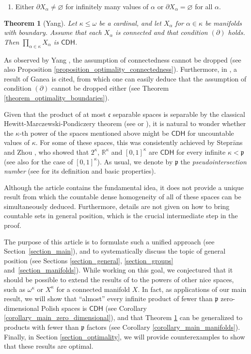 \documentclass{amsart}
\theoremstyle{plain}
\newtheorem{theorem}{Theorem}[section]
\theoremstyle{definition}
\newcommand{\CDH}{\mathsf{CDH}}
\newcommand{\RRR}{\mathbb{R}}
\newcommand{\cccc}{\mathfrak{c}}
\newcommand{\pppp}{\mathfrak{p}}
\begin{document}
\begin{enumerate}
\item[$(\partial)$]	Either $\partial X_\alpha\neq\varnothing$ for infinitely many values of $\alpha$ or $\partial X_\alpha=\varnothing$ for all $\alpha$.
\end{enumerate}

\begin{theorem}[Yang]\label{theorem_yang}
Let $\kappa\leq\omega$ be a cardinal, and let $X_\alpha$ for $\alpha\in\kappa$ be manifolds with boundary. Assume that each $X_\alpha$ is connected and that condition $(\partial)$ holds. Then $\prod_{\alpha\in\kappa}X_\alpha$ is $\CDH$.
\end{theorem}

As observed by Yang \cite[Example 1]{yang}, the assumption of connectedness cannot be dropped (see also Proposition \ref{proposition_optimality_connectedness}). Furthermore, in \cite[Remark 2]{yang}, a result of Ganea \cite{ganea} is cited, from which one can easily deduce that the assumption of condition $(\partial)$ cannot be dropped either (see Theorem \ref{theorem_optimality_boundaries}).

Given that the product of at most $\cccc$ separable spaces is separable by the classical Hewitt-Marczewski-Pondiczery theorem (see \cite[Corollary 2.3.16]{engelking} or \cite[Exercise III.2.13]{kunen}), it is natural to wonder whether the $\kappa$-th power of the spaces mentioned above might be $\CDH$ for uncountable values of $\kappa$. For some of these spaces, this was consistently achieved by Stepr\={a}ns and Zhou \cite[Theorem 4]{steprans_zhou}, who showed that $2^\kappa$, $\RRR^\kappa$ and $[0,1]^\kappa$ are $\CDH$ for every infinite $\kappa<\pppp$ (see also \cite[Section 6]{hernandez_gutierrez_function} for the case of $[0,1]^\kappa$). As usual, we denote by $\pppp$ the \emph{pseudointersection number} (see \cite{kunen} for its definition and basic properties).

Although the article \cite{steprans_zhou} contains the fundamental idea, it does not provide a unique result from which the countable dense homogeneity of all of these spaces can be simultaneously deduced. Furthermore, details are not given on how to bring countable sets in general position, which is the crucial intermediate step in the proof.

The purpose of this article is to formulate such a unified approach (see Section~\ref{section_main}), and to systematically discuss the topic of general position (see Sections \ref{section_general}, \ref{section_groups} and~\ref{section_manifolds}). While working on this goal, we conjectured that it should be possible to extend the results of \cite{steprans_zhou} to the powers of other nice spaces, such as $\omega^\kappa$ or $X^\kappa$ for a connected manifold $X$. In fact, as applications of our main result, we will show that ``almost'' every infinite product of fewer than $\pppp$ zero-dimensional Polish spaces is $\CDH$ (see Corollary \ref{corollary_main_zero_dimensional}), and that Theorem \ref{theorem_yang} can be generalized to products with fewer than $\pppp$ factors (see Corollary \ref{corollary_main_manifolds}). Finally, in  Section \ref{section_optimality}, we will provide counterexamples to show that these results are optimal.
\end{document}
